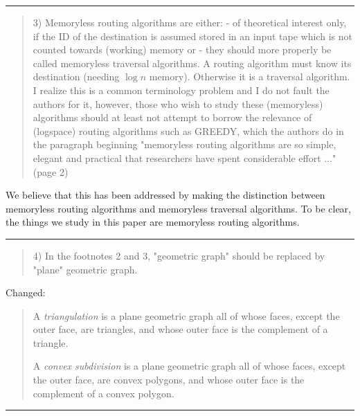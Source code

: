 \documentclass{article}
\begin{document}
\hrule

\begin{quote}
3) Memoryless routing algorithms are either:
- of theoretical interest only, if the ID of the destination is assumed
stored in an input tape which is not counted towards (working) memory or
- they should more properly be called memoryless traversal algorithms. A
routing algorithm must know its destination (needing $\log n$ memory).
Otherwise it is a traversal algorithm. I realize this is a common
terminology problem and I do not fault the authors for it, however,
those who wish to study these (memoryless) algorithms should at least not
attempt to borrow the relevance of (logspace) routing algorithms such as
GREEDY, which the authors do in the paragraph beginning "memoryless routing
algorithms are so simple, elegant and practical that researchers have spent
considerable effort ..."  (page 2)
\end{quote}

We believe that this has been addressed by making the distinction between memoryless routing algorithms and memoryless traversal algorithms.  To be clear, the things we study in this paper are memoryless routing algorithms.

\hrule

\begin{quote}
4) In the footnotes 2 and 3, "geometric graph" should be replaced by "plane"
geometric graph.
\end{quote}

Changed:

\begin{quote}
A \emph{triangulation} is a plane geometric graph all of whose faces, except the outer face, are triangles, and whose outer face is the complement of a triangle.

A \emph{convex subdivision} is a plane geometric graph all of whose faces, except the outer face, are convex polygons, and whose outer face is the complement of a convex polygon.
\end{quote}


\hrule
\end{document}
